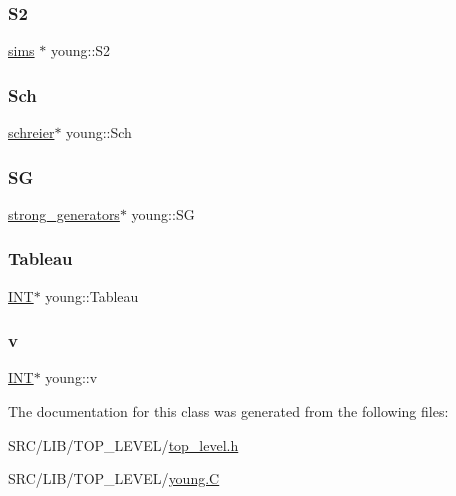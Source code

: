 \mbox{\label{classyoung_a675673220378bdcd6d7e71740840fca4}} 
\subsubsection{\texorpdfstring{S2}{S2}}
{\footnotesize\ttfamily \mbox{\hyperlink{classsims}{sims}} $\ast$ young\+::\+S2}

\mbox{\label{classyoung_a0988209861e75743fc08f9fa2e77a1d2}} 
\subsubsection{\texorpdfstring{Sch}{Sch}}
{\footnotesize\ttfamily \mbox{\hyperlink{classschreier}{schreier}}$\ast$ young\+::\+Sch}

\mbox{\label{classyoung_a15ba6eae0083a330b458090189e879d0}} 
\subsubsection{\texorpdfstring{SG}{SG}}
{\footnotesize\ttfamily \mbox{\hyperlink{classstrong__generators}{strong\+\_\+generators}}$\ast$ young\+::\+SG}

\mbox{\label{classyoung_a69c5ae2e0462ffeb101184aef3f0efa8}} 
\subsubsection{\texorpdfstring{Tableau}{Tableau}}
{\footnotesize\ttfamily \mbox{\hyperlink{galois_8h_a09fddde158a3a20bd2dcadb609de11dc}{I\+NT}}$\ast$ young\+::\+Tableau}

\mbox{\label{classyoung_a14a85fcb7a6636be06204ae5284ce248}} 
\subsubsection{\texorpdfstring{v}{v}}
{\footnotesize\ttfamily \mbox{\hyperlink{galois_8h_a09fddde158a3a20bd2dcadb609de11dc}{I\+NT}}$\ast$ young\+::v}



The documentation for this class was generated from the following files\+:\begin{DoxyCompactItemize}
\item 
S\+R\+C/\+L\+I\+B/\+T\+O\+P\+\_\+\+L\+E\+V\+E\+L/\mbox{\hyperlink{top__level_8h}{top\+\_\+level.\+h}}\item 
S\+R\+C/\+L\+I\+B/\+T\+O\+P\+\_\+\+L\+E\+V\+E\+L/\mbox{\hyperlink{young_8_c}{young.\+C}}\end{DoxyCompactItemize}
